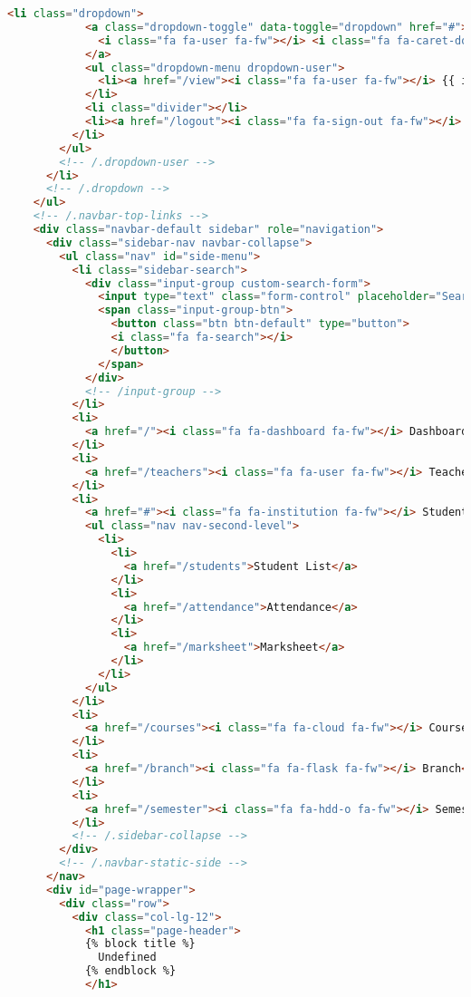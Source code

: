 \begin{lstlisting}[language=HTML]
          <li class="dropdown">
            <a class="dropdown-toggle" data-toggle="dropdown" href="#">
              <i class="fa fa-user fa-fw"></i> <i class="fa fa-caret-down"></i>
            </a>
            <ul class="dropdown-menu dropdown-user">
              <li><a href="/view"><i class="fa fa-user fa-fw"></i> {{ id }}</a>
            </li>
            <li class="divider"></li>
            <li><a href="/logout"><i class="fa fa-sign-out fa-fw"></i> Logout</a>
          </li>
        </ul>
        <!-- /.dropdown-user -->
      </li>
      <!-- /.dropdown -->
    </ul>
    <!-- /.navbar-top-links -->
    <div class="navbar-default sidebar" role="navigation">
      <div class="sidebar-nav navbar-collapse">
        <ul class="nav" id="side-menu">
          <li class="sidebar-search">
            <div class="input-group custom-search-form">
              <input type="text" class="form-control" placeholder="Search...">
              <span class="input-group-btn">
                <button class="btn btn-default" type="button">
                <i class="fa fa-search"></i>
                </button>
              </span>
            </div>
            <!-- /input-group -->
          </li>
          <li>
            <a href="/"><i class="fa fa-dashboard fa-fw"></i> Dashboard</a>
          </li>
          <li>
            <a href="/teachers"><i class="fa fa-user fa-fw"></i> Teachers</a>
          </li>
          <li>
            <a href="#"><i class="fa fa-institution fa-fw"></i> Students<span class="fa arrow"></span></a>
            <ul class="nav nav-second-level">
              <li>
                <li>
                  <a href="/students">Student List</a>
                </li>
                <li>
                  <a href="/attendance">Attendance</a>
                </li>
                <li>
                  <a href="/marksheet">Marksheet</a>
                </li>
              </li>
            </ul>
          </li>
          <li>
            <a href="/courses"><i class="fa fa-cloud fa-fw"></i> Courses</a>
          </li>
          <li>
            <a href="/branch"><i class="fa fa-flask fa-fw"></i> Branch</a>
          </li>
          <li>
            <a href="/semester"><i class="fa fa-hdd-o fa-fw"></i> Semester Details</a>
          </li>
          <!-- /.sidebar-collapse -->
        </div>
        <!-- /.navbar-static-side -->
      </nav>
      <div id="page-wrapper">
        <div class="row">
          <div class="col-lg-12">
            <h1 class="page-header">
            {% block title %}
              Undefined
            {% endblock %}
            </h1>

\end{lstlisting}
